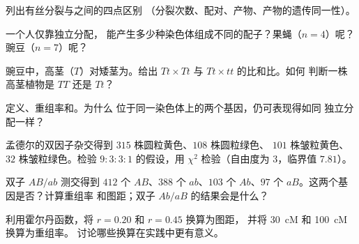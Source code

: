 \begin{exercise}[$\star$]\label{exo:b2:meiosis-heredity:1}
列出有丝分裂与之间的四点区别
（分裂次数、配对、产物、产物的遗传同一性）。
\end{exercise}

\begin{exercise}[$\star$]\label{exo:b2:meiosis-heredity:2}
一个人仅靠独立分配，
能产生多少种染色体组成不同的配子？果蝇（$n = 4$）呢？豌豆（$n =
7$）呢？
\end{exercise}

\begin{exercise}[$\star$]\label{exo:b2:meiosis-heredity:3}
豌豆中，高茎（$T$）对矮茎为。给出
$Tt \times Tt$ 与 $Tt \times tt$ 的比和比。如何
判断一株高茎植物是 $TT$ 还是 $Tt$？
\end{exercise}

\begin{exercise}[$\star$]\label{exo:b2:meiosis-heredity:4}
定义、重组率和。为什么
位于同一染色体上的两个基因，仍可表现得如同
独立分配一样？
\end{exercise}

\begin{exercise}[$\star\star$]\label{exo:b2:meiosis-heredity:5}
孟德尔的双因子杂交得到 $315$ 株圆粒黄色、$108$ 株圆粒绿色、
$101$ 株皱粒黄色、$32$ 株皱粒绿色。检验 $9 : 3 : 3 :
1$ 的假设，用 $\chi^2$ 检验（自由度为 3，临界值
$7.81$）。
\end{exercise}

\begin{exercise}[$\star\star$]\label{exo:b2:meiosis-heredity:6}
双子 $AB/ab$ 测交得到 $412$ 个 $AB$、$388$ 个 $ab$、$103$
个 $Ab$、$97$ 个 $aB$。这两个基因是否？计算重组率
和图距；双子 $Ab/aB$ 的结果会是什么？
\end{exercise}

\begin{exercise}[$\star\star$]\label{exo:b2:meiosis-heredity:7}
利用霍尔丹函数，将 $r = 0.20$ 和 $r = 0.45$ 换算为图距，
并将 \qty{30}{cM} 和 \qty{100}{cM} 换算为重组率。
讨论哪些换算在实践中更有意义。
\end{exercise}

